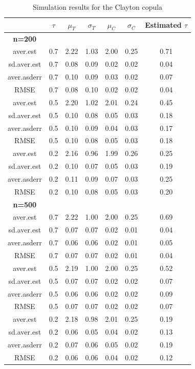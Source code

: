\begin{table}[h]
    \centering
    \caption{Simulation results for the Clayton copula}
    \begin{tabular}{|c|c|c|c|c|c|c|}
        \hline
        & \(\tau\) & \(\mu_T\) & \(\sigma_T\) & \(\mu_C\) & \(\sigma_C\) & Estimated \(\tau\) \\ 
        \hline
        \textbf{n=200} & & & & & & \\
        \hline
        aver.est    & 0.7 & 2.22 & 1.03 & 2.00 & 0.25 & 0.71 \\ 
        sd.aver.est & 0.7 & 0.08 & 0.09 & 0.02 & 0.02 & 0.04 \\ 
        aver.asderr & 0.7 & 0.10 & 0.09 & 0.03 & 0.02 & 0.07 \\ 
        RMSE        & 0.7 & 0.08 & 0.10 & 0.02 & 0.02 & 0.04 \\ 
        \hline
        aver.est    & 0.5 & 2.20 & 1.02 & 2.01 & 0.24 & 0.45 \\ 
        sd.aver.est & 0.5 & 0.10 & 0.08 & 0.05 & 0.03 & 0.18 \\ 
        aver.asderr & 0.5 & 0.10 & 0.09 & 0.04 & 0.03 & 0.17 \\ 
        RMSE        & 0.5 & 0.10 & 0.08 & 0.05 & 0.03 & 0.18 \\ 
        \hline
        aver.est    & 0.2 & 2.16 & 0.96 & 1.99 & 0.26 & 0.25 \\ 
        sd.aver.est & 0.2 & 0.10 & 0.07 & 0.05 & 0.03 & 0.19 \\ 
        aver.asderr & 0.2 & 0.11 & 0.09 & 0.07 & 0.03 & 0.25 \\ 
        RMSE        & 0.2 & 0.10 & 0.08 & 0.05 & 0.03 & 0.20 \\ 
        \hline
        \textbf{n=500} & & & & & & \\
        \hline
        aver.est    & 0.7 & 2.22 & 1.00 & 2.00 & 0.25 & 0.69 \\ 
        sd.aver.est & 0.7 & 0.07 & 0.07 & 0.02 & 0.01 & 0.04 \\ 
        aver.asderr & 0.7 & 0.06 & 0.06 & 0.02 & 0.01 & 0.05 \\ 
        RMSE        & 0.7 & 0.07 & 0.07 & 0.02 & 0.01 & 0.04 \\ 
        \hline
        aver.est    & 0.5 & 2.19 & 1.00 & 2.00 & 0.25 & 0.52 \\ 
        sd.aver.est & 0.5 & 0.07 & 0.07 & 0.02 & 0.02 & 0.07 \\ 
        aver.asderr & 0.5 & 0.06 & 0.06 & 0.02 & 0.02 & 0.09 \\ 
        RMSE        & 0.5 & 0.07 & 0.07 & 0.02 & 0.02 & 0.07 \\ 
        \hline
        aver.est    & 0.2 & 2.18 & 0.98 & 2.01 & 0.25 & 0.19 \\ 
        sd.aver.est & 0.2 & 0.06 & 0.05 & 0.04 & 0.02 & 0.13 \\ 
        aver.asderr & 0.2 & 0.07 & 0.06 & 0.05 & 0.02 & 0.19 \\ 
        RMSE        & 0.2 & 0.06 & 0.06 & 0.04 & 0.02 & 0.12 \\ 
        \hline
    \end{tabular}
    \label{tab:clayton_results}
\end{table}

